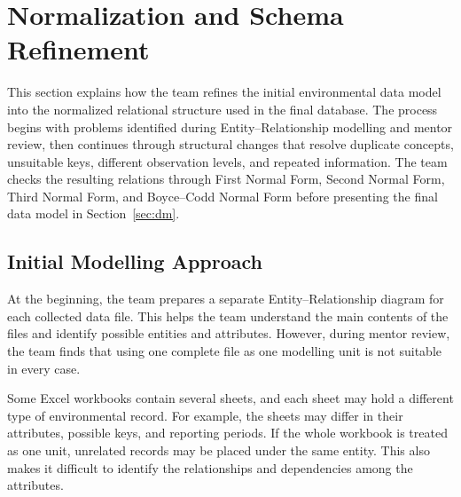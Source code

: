 \section{Normalization and Schema Refinement}
\label{sec:norm}

\setlength{\abovedisplayskip}{5pt plus 2pt minus 2pt}
\setlength{\belowdisplayskip}{5pt plus 2pt minus 2pt}
\setlength{\abovedisplayshortskip}{2pt plus 2pt}
\setlength{\belowdisplayshortskip}{3pt plus 2pt minus 2pt}

This section explains how the team refines the initial environmental data model
into the normalized relational structure used in the final database. The
process begins with problems identified during Entity--Relationship modelling
and mentor review, then continues through structural changes that resolve
duplicate concepts, unsuitable keys, different observation levels, and
repeated information. The team checks the resulting relations through First
Normal Form, Second Normal Form, Third Normal Form, and Boyce--Codd Normal Form
before presenting the final data model in Section~\ref{sec:dm}.

\subsection{Initial Modelling Approach }
\label{subsec:zeronf}
At the beginning, the team prepares a separate Entity--Relationship diagram
for each collected data file. This helps the team understand the main contents
of the files and identify possible entities and attributes. However, during
mentor review, the team finds that using one complete file as one modelling
unit is not suitable in every case.

Some Excel workbooks contain several sheets, and each sheet may hold a
different type of environmental record. For example, the sheets may differ in
their attributes, possible keys, and reporting periods. If the whole workbook
is treated as one unit, unrelated records may be placed under the same entity.
This also makes it difficult to identify the relationships and dependencies
among the attributes.

